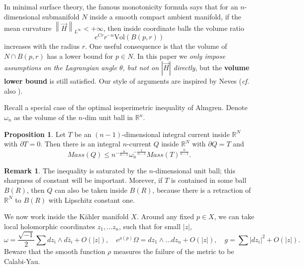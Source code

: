 \documentclass[a4paper]{article}
\theoremstyle{definition}
\newtheorem{rmk}{Remark}
\newtheorem{prop}[thm]{Proposition}
\newcommand{\cf}{\emph{cf.} }
\newcommand{\R}{\mathbb{R}}
\newcommand{\norm}[1]{\left\lVert#1\right\rVert}
\begin{document}
In minimal surface theory, the famous monotonicity formula says that for an $n$-dimensional submanifold $N$ inside a smooth compact ambient manifold, if the mean curvature $\norm{\vec{H}}_{L^\infty}<+\infty$, then inside coordinate balls the volume ratio
\[
e^{Cr} r^{-n}\text{Vol}(B(p,r)) 
\]
increases with the radius $r$. One useful consequence is that the volume of $N\cap B(p,r)$ has a lower bound for $p\in N$. In this paper we \emph{only impose assumptions on the Lagrangian angle $\theta$, but not on $|\vec{H}|$ directly}, but the \textbf{volume lower bound} is still satisfied.  Our style of arguments are inspired by Neves  \cite[section 3.3]{Neves} (\cf also \cite[section 5.2]{Li}).



Recall a special case of the optimal isoperimetric inequality of Almgren. Denote $\omega_n$ as the volume of the $n$-dim unit ball in $\R^n$.

\begin{prop}\cite[Thm 10]{Almgrenisoperimetric}
Let $T$ be an $(n-1)$-dimensional integral current inside $\R^N$ with $\partial T=0$. Then there is an integral $n$-current $Q$ inside $\R^N$ with $\partial Q=T$ and 
\[
Mass(Q) \leq n^{ -\frac{n}{n-1}  } \omega_n^{-\frac{1}{n-1}} Mass(T)^{\frac{n}{n-1}}.
\]
\end{prop}

\begin{rmk}
The inequality is saturated by the $n$-dimensional unit ball; this sharpness of constant will be important. Morever, if $T$ is contained in some ball $B(R)$, then $Q$ can also be taken inside $B(R)$, because there is a retraction of $\R^N$ to $B(R)$ with Lipschitz constant one. 	
\end{rmk}





We now work inside the K\"ahler manifold $X$. Around any fixed $p\in X$, we can take local holomorphic coordinates $z_1,\ldots z_n$, such that for small $|z|$,
\[
\omega= \frac{\sqrt{-1}}{2}\sum dz_i\wedge d\bar{z}_i +O(|z|), \quad e^{\rho(p)}\Omega= dz_1\wedge \ldots dz_n +O(|z|), \quad g= \sum |dz_i|^2 +O(|z|).
\]
Beware that the smooth function $\rho$ measures the failure of the metric to be Calabi-Yau.
\end{document}
